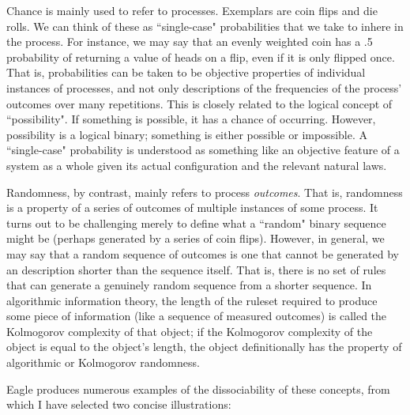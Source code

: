 Chance is mainly used to refer to processes. Exemplars are coin flips and die rolls. We can think of these as ``single-case" probabilities that we take to inhere in the process. For instance, we may say that an evenly weighted coin has a .5 probability of returning a value of heads on a flip, even if it is only flipped once. That is, probabilities can be taken to be objective properties of individual instances of processes, and not only descriptions of the frequencies of the process' outcomes over many repetitions. This is closely related to the logical concept of ``possibility". If something is possible, it has a chance of occurring. However, possibility is a logical binary; something is either possible or impossible. A ``single-case" probability is understood as something like an objective feature of a system as a whole given its actual configuration and the relevant natural laws.  

Randomness, by contrast, mainly refers to process \textit{outcomes}. That is, randomness is a property of a series of outcomes of multiple instances of some process. It turns out to be challenging merely to define what a ``random" binary sequence might be (perhaps generated by a series of coin flips). However, in general, we may say that a random sequence of outcomes is one that cannot be generated by an description shorter than the sequence itself. That is, there is no set of rules that can generate a genuinely random sequence from a shorter sequence. In algorithmic information theory, the length of the ruleset required to produce some piece of information (like a sequence of measured outcomes) is called the Kolmogorov complexity of that object; if the Kolmogorov complexity of the object is equal to the object's length, the object definitionally has the property of algorithmic or Kolmogorov randomness.

Eagle produces numerous examples of the dissociability of these concepts, from which I have selected two concise illustrations:

